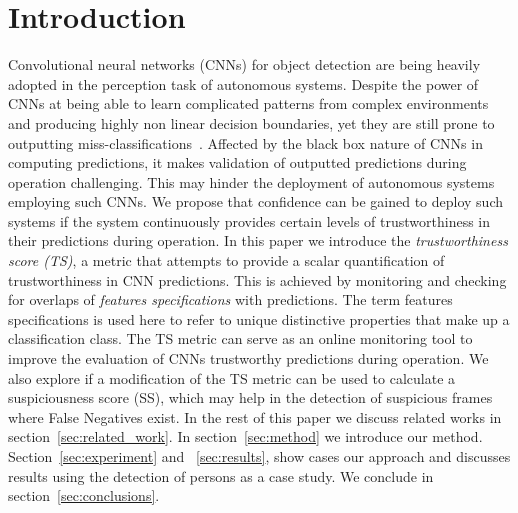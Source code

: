 \section{Introduction}
Convolutional neural networks (CNNs) for object detection are being  heavily adopted in the perception task of autonomous systems.
%
Despite the power of CNNs at being able to learn complicated patterns from complex environments and producing highly non linear decision boundaries, yet they are still prone to outputting miss-classifications~\cite{Ghobrial2022}. 
%
Affected by the black box nature of CNNs in computing predictions, it makes validation of outputted predictions during operation challenging.
%
This may hinder the deployment of autonomous systems employing such CNNs.
%
We propose that confidence can be gained to deploy such systems if the system continuously provides certain levels of trustworthiness in their predictions during operation.
%
In this paper we introduce the \textit{trustworthiness score (TS)}, a metric that attempts to provide a scalar quantification of trustworthiness in CNN predictions. 
%
This is achieved by monitoring and checking for overlaps of \textit{features specifications} with predictions. 
%
The term features specifications is used here to refer to unique distinctive properties that make up a classification class.
%  
%
The TS metric can serve as an online monitoring tool to improve the evaluation of CNNs trustworthy predictions during operation. We also explore if a modification of the TS metric can be used to calculate a suspiciousness score (SS), which may help in the detection of suspicious frames where False Negatives exist.
%
%
In the rest of this paper we discuss related works in section~\ref{sec:related_work}. In section~\ref{sec:method} we introduce our method.
%
Section~\ref{sec:experiment} and ~\ref{sec:results}, show cases our approach and discusses results using the detection of persons as a case study.
%
We conclude in section~\ref{sec:conclusions}.




